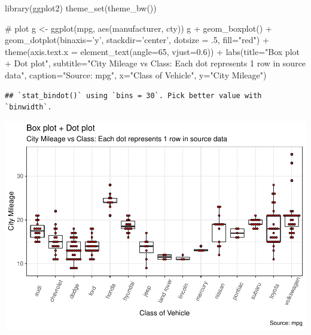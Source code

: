 \documentclass[a4paper]{article}
\newenvironment{Shaded}{}{}
\newcommand{\KeywordTok}[1]{\textcolor[rgb]{0.00,0.00,1.00}{#1}}
\newcommand{\DataTypeTok}[1]{#1}
\newcommand{\DecValTok}[1]{#1}
\newcommand{\FloatTok}[1]{#1}
\newcommand{\StringTok}[1]{\textcolor[rgb]{0.00,0.50,0.50}{#1}}
\newcommand{\CommentTok}[1]{\textcolor[rgb]{0.00,0.50,0.00}{#1}}
\newcommand{\OperatorTok}[1]{#1}
\newcommand{\NormalTok}[1]{#1}
\begin{document}
\begin{Shaded}
\begin{Highlighting}[]
\KeywordTok{library}\NormalTok{(ggplot2)}
\KeywordTok{theme_set}\NormalTok{(}\KeywordTok{theme_bw}\NormalTok{())}

\CommentTok{# plot}
\NormalTok{g <-}\StringTok{ }\KeywordTok{ggplot}\NormalTok{(mpg, }\KeywordTok{aes}\NormalTok{(manufacturer, cty))}
\NormalTok{g }\OperatorTok{+}\StringTok{ }\KeywordTok{geom_boxplot}\NormalTok{() }\OperatorTok{+}\StringTok{ }
\StringTok{  }\KeywordTok{geom_dotplot}\NormalTok{(}\DataTypeTok{binaxis=}\StringTok{'y'}\NormalTok{, }
               \DataTypeTok{stackdir=}\StringTok{'center'}\NormalTok{, }
               \DataTypeTok{dotsize =}\NormalTok{ .}\DecValTok{5}\NormalTok{, }
               \DataTypeTok{fill=}\StringTok{"red"}\NormalTok{) }\OperatorTok{+}
\StringTok{  }\KeywordTok{theme}\NormalTok{(}\DataTypeTok{axis.text.x =} \KeywordTok{element_text}\NormalTok{(}\DataTypeTok{angle=}\DecValTok{65}\NormalTok{, }\DataTypeTok{vjust=}\FloatTok{0.6}\NormalTok{)) }\OperatorTok{+}\StringTok{ }
\StringTok{  }\KeywordTok{labs}\NormalTok{(}\DataTypeTok{title=}\StringTok{"Box plot + Dot plot"}\NormalTok{, }
       \DataTypeTok{subtitle=}\StringTok{"City Mileage vs Class: Each dot represents 1 row in source data"}\NormalTok{,}
       \DataTypeTok{caption=}\StringTok{"Source: mpg"}\NormalTok{,}
       \DataTypeTok{x=}\StringTok{"Class of Vehicle"}\NormalTok{,}
       \DataTypeTok{y=}\StringTok{"City Mileage"}\NormalTok{)}
\end{Highlighting}
\end{Shaded}

\begin{verbatim}
## `stat_bindot()` using `bins = 30`. Pick better value with `binwidth`.
\end{verbatim}

\includegraphics{M24-ggplot2_Gallery_files/figure-latex/unnamed-chunk-28-1.pdf}
\end{document}
